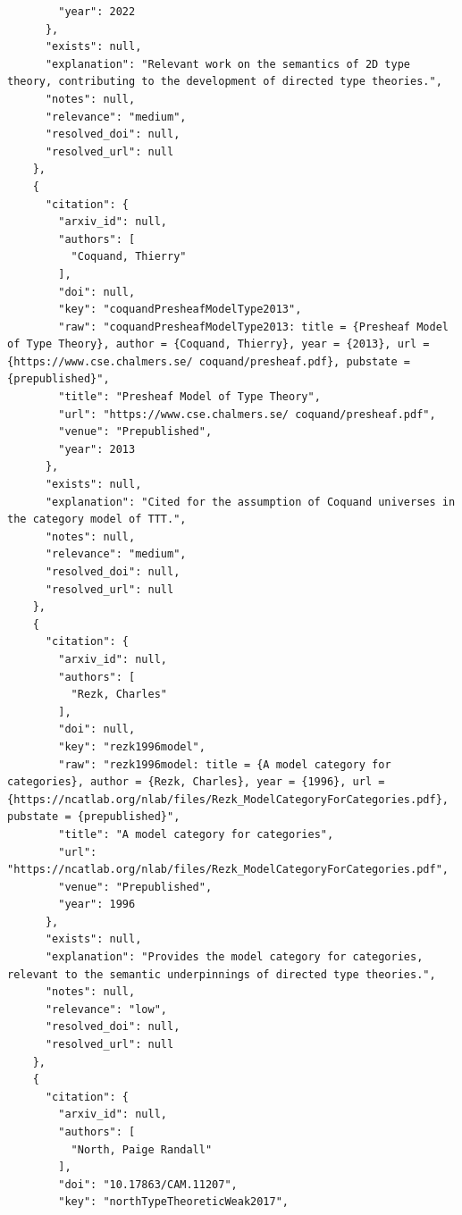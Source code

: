 \documentclass[11pt]{article}
\begin{document}
\begin{verbatim}
        "year": 2022
      },
      "exists": null,
      "explanation": "Relevant work on the semantics of 2D type theory, contributing to the development of directed type theories.",
      "notes": null,
      "relevance": "medium",
      "resolved_doi": null,
      "resolved_url": null
    },
    {
      "citation": {
        "arxiv_id": null,
        "authors": [
          "Coquand, Thierry"
        ],
        "doi": null,
        "key": "coquandPresheafModelType2013",
        "raw": "coquandPresheafModelType2013: title = {Presheaf Model of Type Theory}, author = {Coquand, Thierry}, year = {2013}, url = {https://www.cse.chalmers.se/ coquand/presheaf.pdf}, pubstate = {prepublished}",
        "title": "Presheaf Model of Type Theory",
        "url": "https://www.cse.chalmers.se/ coquand/presheaf.pdf",
        "venue": "Prepublished",
        "year": 2013
      },
      "exists": null,
      "explanation": "Cited for the assumption of Coquand universes in the category model of TTT.",
      "notes": null,
      "relevance": "medium",
      "resolved_doi": null,
      "resolved_url": null
    },
    {
      "citation": {
        "arxiv_id": null,
        "authors": [
          "Rezk, Charles"
        ],
        "doi": null,
        "key": "rezk1996model",
        "raw": "rezk1996model: title = {A model category for categories}, author = {Rezk, Charles}, year = {1996}, url = {https://ncatlab.org/nlab/files/Rezk_ModelCategoryForCategories.pdf}, pubstate = {prepublished}",
        "title": "A model category for categories",
        "url": "https://ncatlab.org/nlab/files/Rezk_ModelCategoryForCategories.pdf",
        "venue": "Prepublished",
        "year": 1996
      },
      "exists": null,
      "explanation": "Provides the model category for categories, relevant to the semantic underpinnings of directed type theories.",
      "notes": null,
      "relevance": "low",
      "resolved_doi": null,
      "resolved_url": null
    },
    {
      "citation": {
        "arxiv_id": null,
        "authors": [
          "North, Paige Randall"
        ],
        "doi": "10.17863/CAM.11207",
        "key": "northTypeTheoreticWeak2017",

\end{verbatim}
\end{document}
